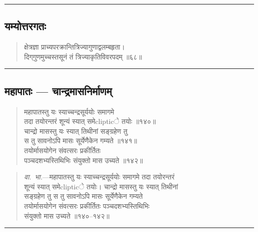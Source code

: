 \documentclass[11pt,a4paper]{article}
\newcommand{\longline}{\noindent\rule{\textwidth}{0.4pt}}
\newcommand{\dev}[1]{{\devanagarifont #1}}
\newenvironment{shloka}{%
  \begin{quote}
  \small
  \setlength{\leftmargin}{2em}
  \devanagarifont
}{\end{quote}}
\newenvironment{vyakhya}{%
  \begin{quote}
  \small
  \setlength{\leftmargin}{1em}
  \devanagarifont
}{\end{quote}}
\newcommand{\skt}[1]{{\devanagarifont #1}}
\begin{document}
\longline

\subsection{\dev{यम्योत्तरगतः}}

\begin{shloka}
\skt{क्षेत्रज्ञा प्राच्यपरक्रान्तित्रिज्यागुणाद्वलम्बहृता।}\\
\skt{दिग्‌गुणमुच्चस्तसूनं तं त्रिज्याकृतिविवरपदम् ॥६८॥}
\end{shloka}

\longline

\subsection{\dev{महापातः — चान्द्रमासनिर्माणम्}}

\begin{shloka}
\skt{महापातस्तु यः स्याच्चन्द्रसूर्ययोः समागमे}\\[0.3em]
\skt{तदा तयोरन्तरं शून्यं स्यात् समेclipticे तयोः ॥१४०॥}\\[0.3em]
\skt{चान्द्रो मासस्तु यः स्यात् तिथीनां सङ्ग्रहेण तु}\\[0.3em]
\skt{स तु सावनोऽपि मासः सूर्येणैकेन गम्यते ॥१४१॥}\\[0.3em]
\skt{तयोर्मासयोगेन संवत्सरः प्रकीर्तितः}\\[0.3em]
\skt{पञ्चदशभ्यस्तिथिभिः संयुक्तो मास उच्यते ॥१४२॥}
\end{shloka}

\begin{vyakhya}
\textit{वा.~भा.}—\skt{महापातस्तु यः स्याच्चन्द्रसूर्ययोः समागमे तदा तयोरन्तरं}\\
\skt{शून्यं स्यात् समेclipticे तयोः। चान्द्रो मासस्तु यः स्यात् तिथीनां}\\
\skt{सङ्ग्रहेण तु स तु सावनोऽपि मासः सूर्येणैकेन गम्यते}\\
\skt{तयोर्मासयोगेन संवत्सरः प्रकीर्तितः पञ्चदशभ्यस्तिथिभिः}\\
\skt{संयुक्तो मास उच्यते ॥१४०--१४२॥}
\end{vyakhya}

\longline
\end{document}
